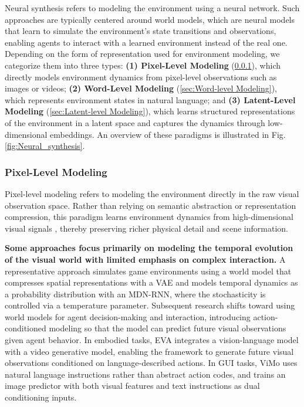 Neural synthesis refers to modeling the environment using a neural network. Such approaches are typically centered around world models, which are neural models that learn to simulate the environment's state transitions and observations, enabling agents to interact with a learned environment instead of the real one. Depending on the form of representation used for environment modeling, we categorize them into three types: \textbf{(1) Pixel-Level Modeling} (\cref{sec:Pixel-level Modeling}), which directly models environment dynamics from pixel-level observations such as images or videos; \textbf{(2) Word-Level Modeling} (\cref{sec:Word-level Modeling}), which represents environment states in natural language; and \textbf{(3) Latent-Level Modeling} (\cref{sec:Latent-level Modeling}), which learns structured representations of the environment in a latent space and captures the dynamics through low-dimensional embeddings. An overview of these paradigms is illustrated in Fig. \ref{fig:Neural_synthesis}.


\subsubsection{Pixel-Level Modeling}
\label{sec:Pixel-level Modeling}
Pixel-level modeling refers to modeling the environment directly in the raw visual observation space. Rather than relying on semantic abstraction or representation compression, this paradigm learns environment dynamics from high-dimensional visual signals \cite{DIAMOND, DreamGen, Pandora}, thereby preserving richer physical detail and scene information. 

\textbf{Some approaches focus primarily on modeling the temporal evolution of the visual world with limited emphasis on complex interaction.} 
A representative approach \cite{Recurrent_World_Models_Facilitate_Policy_Evolution} simulates game environments using a world model that compresses spatial representations with a VAE and models temporal dynamics as a probability distribution with an MDN-RNN, where the stochasticity is controlled via a temperature parameter. Subsequent research shifts toward using world models for agent decision-making and interaction, introducing action-conditioned modeling so that the model can predict future visual observations given agent behavior. In embodied tasks, EVA \cite{EVA} integrates a vision-language model with a video generative model, enabling the framework to generate future visual observations conditioned on language-described actions. In GUI tasks, ViMo \cite{ViMo} uses natural language instructions rather than abstract action codes, and trains an image predictor with both visual features and text instructions as dual conditioning inputs.

